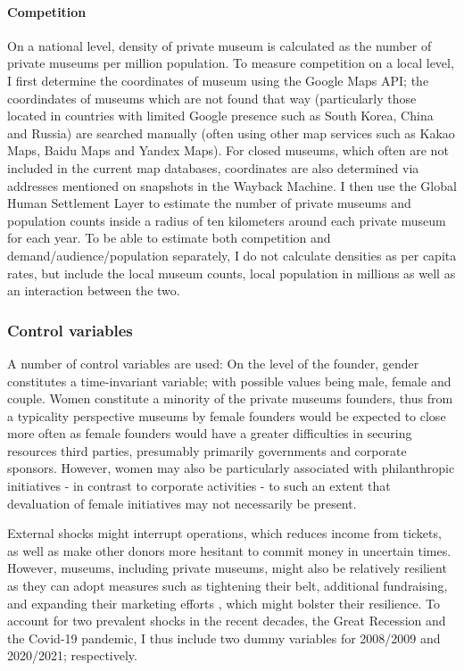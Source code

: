 \documentclass[12pt]{article}
\begin{document}
\paragraph*{Competition}

On a national level, density of private museum is calculated as the number of private museums per million population.
To measure competition on a local level, I first determine the coordinates of museum using the Google Maps API; the coordindates of museums which are not found that way (particularly those located in countries with limited Google presence such as South Korea, China and Russia) are searched manually (often using other map services such as Kakao Maps, Baidu Maps and Yandex Maps).
For closed museums, which often are not included in the current map databases, coordinates are also determined via addresses mentioned on snapshots in the Wayback Machine.
I then use the Global Human Settlement Layer \parencite{EC_2023_GHSL} to estimate the number of private museums and population counts inside a radius of ten kilometers around each private museum for each year.
To be able to estimate both competition and demand/audience/population separately, I do not calculate densities as per capita rates, but include the local museum counts, local population in millions as well as an interaction between the two.
\subsubsection*{Control variables}


\bigbreak
\noindent
A number of control variables are used: 
On the level of the founder, gender constitutes a time-invariant variable; with possible values being male, female and couple.
Women constitute a minority of the private museums founders, thus from a typicality perspective \parencite{Rosch_1975_family} museums by female founders would be expected to close more often as female founders would have a greater difficulties in securing resources third parties, presumably primarily governments and corporate sponsors.
However, women may also be particularly associated with philanthropic initiatives - in contrast to corporate activities \parencite{Milam_2013_artgirls} - to such an extent that devaluation of female initiatives may not necessarily be present.

External shocks might interrupt operations, which reduces income from tickets, as well as make other donors more hesitant to commit money in uncertain times.
However, museums, including private museums, might also be relatively resilient as they can adopt measures such as tightening their belt, additional fundraising, and expanding their marketing efforts \parencite{Geller_Salamon_2010_resilience}, which might bolster their resilience.
To account for two prevalent shocks in the recent decades, the Great Recession and the Covid-19 pandemic, I thus include two dummy variables for 2008/2009 and 2020/2021; respectively.
\end{document}
